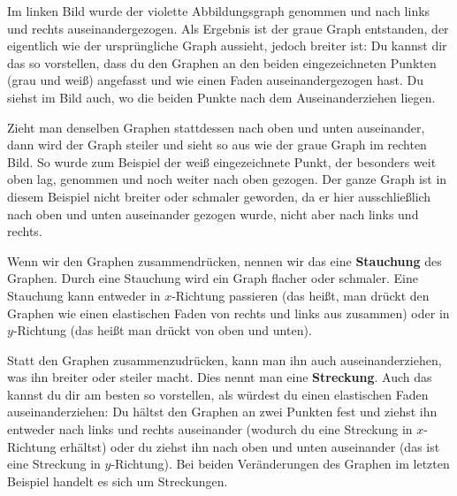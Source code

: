 \documentclass[../../main.tex]{subfiles}
\begin{document}
\begin{example}{}
\begin{multicols}{2}
    \end{multicols}
    Im linken Bild wurde der violette Abbildungsgraph genommen und nach links und rechts auseinandergezogen. Als Ergebnis ist der graue Graph entstanden, der eigentlich wie der ursprüngliche Graph aussieht, jedoch breiter ist: Du kannst dir das so vorstellen, dass du den Graphen an den beiden eingezeichneten Punkten (grau und weiß) angefasst und wie einen Faden auseinandergezogen hast. Du siehst im Bild auch, wo die beiden Punkte nach dem Auseinanderziehen liegen.
    
    Zieht man denselben Graphen stattdessen nach oben und unten auseinander, dann wird der Graph steiler und sieht so aus wie der graue Graph im rechten Bild. So wurde zum Beispiel der weiß eingezeichnete Punkt, der besonders weit oben lag, genommen und noch weiter nach oben gezogen. Der ganze Graph ist in diesem Beispiel nicht breiter oder schmaler geworden, da er hier ausschließlich nach oben und unten auseinander gezogen wurde, nicht aber nach links und rechts.
\end{example}

Wenn wir den Graphen zusammendrücken, nennen wir das eine \textbf{Stauchung} des Graphen. Durch eine Stauchung wird ein Graph flacher oder schmaler. Eine Stauchung kann entweder in $x$-Richtung passieren (das heißt, man drückt den Graphen wie einen elastischen Faden von rechts und links aus zusammen) oder in $y$-Richtung (das heißt man drückt von oben und unten).

Statt den Graphen zusammenzudrücken, kann man ihn auch auseinanderziehen, was ihn breiter oder steiler macht. Dies nennt man eine \textbf{Streckung}. Auch das kannst du dir am besten so vorstellen, als würdest du einen elastischen Faden auseinanderziehen: Du hältst den Graphen an zwei Punkten fest und ziehst ihn entweder nach links und rechts auseinander (wodurch du eine Streckung in $x$-Richtung erhältst) oder du ziehst ihn nach oben und unten auseinander (das ist eine Streckung in $y$-Richtung). Bei beiden Veränderungen des Graphen im letzten Beispiel handelt es sich um Streckungen.
\end{document}
